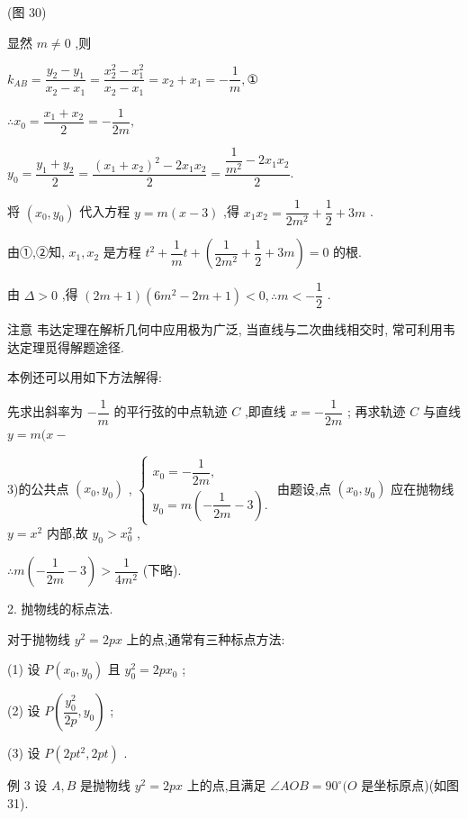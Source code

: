 (图 30)

显然 $m \neq  0$ ,则

${k}_{AB} = \dfrac{{y}_{2} - {y}_{1}}{{x}_{2} - {x}_{1}} = \dfrac{{x}_{2}^{2} - {x}_{1}^{2}}{{x}_{2} - {x}_{1}} = {x}_{2} + {x}_{1} =  - \dfrac{1}{m},$①

$\therefore {x}_{0} = \dfrac{{x}_{1} + {x}_{2}}{2} =  - \dfrac{1}{2m},$

${y}_{0} = \dfrac{{y}_{1} + {y}_{2}}{2} = \dfrac{{\left( {x}_{1} + {x}_{2}\right) }^{2} - 2{x}_{1}{x}_{2}}{2} = \dfrac{\dfrac{1}{{m}^{2}} - 2{x}_{1}{x}_{2}}{2}.$

将 $\left( {{x}_{0},{y}_{0}}\right)$ 代入方程 $y = m\left( {x - 3}\right)$ ,得 ${x}_{1}{x}_{2} = \dfrac{1}{2{m}^{2}} + \dfrac{1}{2} + {3m}$ .

由①,②知, ${x}_{1},{x}_{2}$ 是方程 ${t}^{2} + \dfrac{1}{m}t + \left( {\dfrac{1}{2{m}^{2}} + \dfrac{1}{2} + {3m}}\right)  = 0$ 的根.

由 $\Delta  > 0$ ,得 $\left( {{2m} + 1}\right) \left( {6{m}^{2} - {2m} + 1}\right)  < 0,\therefore m <  - \dfrac{1}{2}$ .

注意 韦达定理在解析几何中应用极为广泛, 当直线与二次曲线相交时, 常可利用韦达定理觅得解题途径.

本例还可以用如下方法解得:

先求出斜率为 $- \dfrac{1}{m}$ 的平行弦的中点轨迹 $C$ ,即直线 $x =  - \dfrac{1}{2m}$ ; 再求轨迹 $C$ 与直线 $y = m(x -$

3)的公共点 $\left( {{x}_{0},{y}_{0}}\right)$ , $\left\{  \begin{array}{l} {x}_{0} =  - \dfrac{1}{2m}, \\  {y}_{0} = m\left( {-\dfrac{1}{2m} - 3}\right) . \end{array}\right.$ 由题设,点 $\left( {{x}_{0},{y}_{0}}\right)$ 应在抛物线 $y = {x}^{2}$ 内部,故 ${y}_{0} > {x}_{0}^{2}$ ,

$\therefore m\left( {-\dfrac{1}{2m} - 3}\right)  > \dfrac{1}{4{m}^{2}}$ (下略).

2. 抛物线的标点法.

对于抛物线 ${y}^{2} = {2px}$ 上的点,通常有三种标点方法:

(1) 设 $P\left( {{x}_{0},{y}_{0}}\right)$ 且 ${y}_{0}^{2} = {2p}{x}_{0}$ ;

(2) 设 $P\left( {\dfrac{{y}_{0}^{2}}{2p},{y}_{0}}\right)$ ;

(3) 设 $P\left( {{2p}{t}^{2},{2pt}}\right)$ .

例 3 设 $A,B$ 是抛物线 ${y}^{2} = {2px}$ 上的点,且满足 $\angle {AOB} = {90}^{ \circ  }(O$ 是坐标原点)(如图 31).

